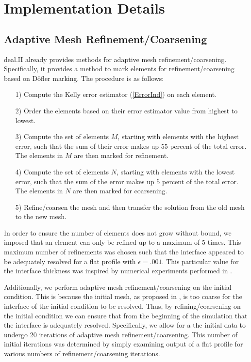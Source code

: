 \documentclass[11pt,fullpage]{article}
\newcommand{\eps}{\epsilon}
\theoremstyle{lemma}
\theoremstyle{definition}
\theoremstyle{lemma}
\begin{document}
\section{Implementation Details}
\subsection{Adaptive Mesh Refinement/Coarsening}
deal.II already provides methods for adaptive mesh refinement/coarsening. Specifically, it provides a method to mark elements for refinement/coarsening based on D\"ofler marking. The procedure is as follows:
\begin{itemize}
	\item[1)] Compute the Kelly error estimator (\ref*{ErrorInd}) on each element.
	
	\item[2)] Order the elements based on their error estimator value from highest to lowest.
	
	\item[3)] Compute the set of elements $M$, starting with elements with the highest error, such that the sum of their error makes up 55 percent of the total error. The elements in $M$ are then marked for refinement.
	
	\item[4)] Compute the set of elements $N$, starting with elements with the lowest error, such that the sum of the error makes up 5 percent of the total error. The elements in $N$ are then marked for coarsening.
	
	\item[5)] Refine/coarsen the mesh and then transfer the solution from the old mesh to the new mesh.
\end{itemize}
In order to ensure the number of elements does not grow without bound, we imposed that an element can only be refined up to a maximum of 5 times. This maximum number of refinements was chosen such that the interface appeared to be adequately resolved for a flat profile with $\eps = .001$. This particular value for the interface thickness was inspired by numerical experiments performed in \cite{DiffuseInterface}. 

Additionally, we perform adaptive mesh refinement/coarsening on the initial condition. This is because the initial mesh, as proposed in \cite{DiffuseInterface}, is too coarse for the interface of the initial condition to be resolved. Thus, by refining/coarsening on the initial condition we can ensure that from the beginning of the simulation that the interface is adequately resolved. Specifically, we allow for a the initial data to undergo 20 iterations of adaptive mesh refinement/coarsening. This number of initial iterations was determined by simply examining output of a flat profile for various numbers of refinement/coarsening iterations.
\end{document}
